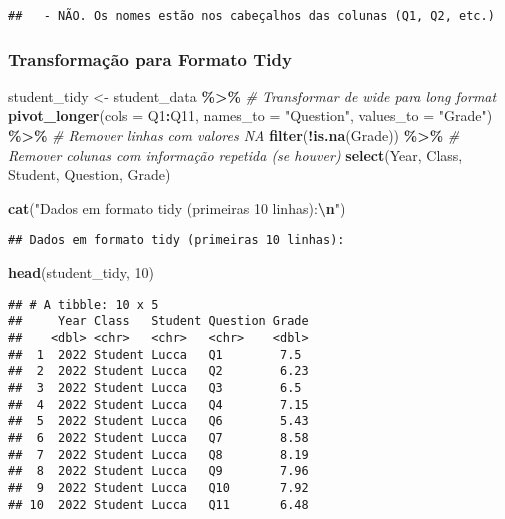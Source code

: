 \documentclass[
]{article}
\newenvironment{Shaded}{\begin{snugshade}}{\end{snugshade}}
\newcommand{\AttributeTok}[1]{\textcolor[rgb]{0.13,0.29,0.53}{#1}}
\newcommand{\CommentTok}[1]{\textcolor[rgb]{0.56,0.35,0.01}{\textit{#1}}}
\newcommand{\DecValTok}[1]{\textcolor[rgb]{0.00,0.00,0.81}{#1}}
\newcommand{\FunctionTok}[1]{\textcolor[rgb]{0.13,0.29,0.53}{\textbf{#1}}}
\newcommand{\NormalTok}[1]{#1}
\newcommand{\OtherTok}[1]{\textcolor[rgb]{0.56,0.35,0.01}{#1}}
\newcommand{\SpecialCharTok}[1]{\textcolor[rgb]{0.81,0.36,0.00}{\textbf{#1}}}
\newcommand{\StringTok}[1]{\textcolor[rgb]{0.31,0.60,0.02}{#1}}
\begin{document}
\begin{verbatim}
##   - NÃO. Os nomes estão nos cabeçalhos das colunas (Q1, Q2, etc.)
\end{verbatim}

\subsubsection{Transformação para Formato
Tidy}\label{transformauxe7uxe3o-para-formato-tidy}

\begin{Shaded}
\begin{Highlighting}[]
\NormalTok{student\_tidy }\OtherTok{\textless{}{-}}\NormalTok{ student\_data }\SpecialCharTok{\%\textgreater{}\%}
  \CommentTok{\# Transformar de wide para long format}
  \FunctionTok{pivot\_longer}\NormalTok{(}\AttributeTok{cols =}\NormalTok{ Q1}\SpecialCharTok{:}\NormalTok{Q11, }
               \AttributeTok{names\_to =} \StringTok{"Question"}\NormalTok{, }
               \AttributeTok{values\_to =} \StringTok{"Grade"}\NormalTok{) }\SpecialCharTok{\%\textgreater{}\%}
  \CommentTok{\# Remover linhas com valores NA}
  \FunctionTok{filter}\NormalTok{(}\SpecialCharTok{!}\FunctionTok{is.na}\NormalTok{(Grade)) }\SpecialCharTok{\%\textgreater{}\%}
  \CommentTok{\# Remover colunas com informação repetida (se houver)}
  \FunctionTok{select}\NormalTok{(Year, Class, Student, Question, Grade)}

\FunctionTok{cat}\NormalTok{(}\StringTok{"Dados em formato tidy (primeiras 10 linhas):}\SpecialCharTok{\textbackslash{}n}\StringTok{"}\NormalTok{)}
\end{Highlighting}
\end{Shaded}

\begin{verbatim}
## Dados em formato tidy (primeiras 10 linhas):
\end{verbatim}

\begin{Shaded}
\begin{Highlighting}[]
\FunctionTok{head}\NormalTok{(student\_tidy, }\DecValTok{10}\NormalTok{)}
\end{Highlighting}
\end{Shaded}

\begin{verbatim}
## # A tibble: 10 x 5
##     Year Class   Student Question Grade
##    <dbl> <chr>   <chr>   <chr>    <dbl>
##  1  2022 Student Lucca   Q1        7.5 
##  2  2022 Student Lucca   Q2        6.23
##  3  2022 Student Lucca   Q3        6.5 
##  4  2022 Student Lucca   Q4        7.15
##  5  2022 Student Lucca   Q6        5.43
##  6  2022 Student Lucca   Q7        8.58
##  7  2022 Student Lucca   Q8        8.19
##  8  2022 Student Lucca   Q9        7.96
##  9  2022 Student Lucca   Q10       7.92
## 10  2022 Student Lucca   Q11       6.48
\end{verbatim}
\end{document}
